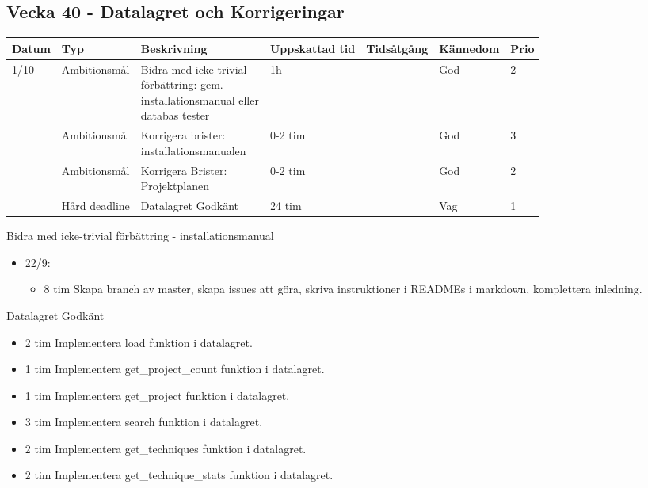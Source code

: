 \documentclass{TDP003mall}
\begin{document}
\subsection*{Vecka 40 - Datalagret och Korrigeringar}
\begin{tabularx}{\linewidth}{|l|l|X|l|l|l|l|}
	\hline
	Datum & Typ           & Beskrivning                                         & Uppskattad tid & Tidsåtgång & Kännedom    & Prio \\ [0.5ex]
	\hline                                                      
	1/10  & Ambitionsmål  & \makecell[tl]{Bidra med icke-trivial \\förbättring: gem. \\installationsmanual eller \\databas tester} & 1h             &            & God & 2    \\
	\hline                                                      
          & Ambitionsmål  & \makecell[tl]{Korrigera brister: \\installationsmanualen}  & 0-2 tim           &            & God       & 3    \\
	\hline                                                      
          & Ambitionsmål  & \makecell[tl]{Korrigera Brister: \\Projektplanen}                   & 0-2 tim           &            & God    & 2    \\
	\hline                                                      
          & Hård deadline & Datalagret Godkänt                                  & 24 tim            &            & Vag         & 1    \\
	\hline
\end{tabularx}

Bidra med icke-trivial förbättring - installationsmanual
\begin{itemize}
\item 22/9:
  \begin{itemize}
  \item 8 tim Skapa branch av master, skapa issues att göra, skriva instruktioner i READMEs i markdown, komplettera inledning.
  \end{itemize}
  \end{itemize}

Datalagret Godkänt
\begin{itemize}
\item 2 tim Implementera load funktion i datalagret.
\item 1 tim Implementera get\_project\_count funktion i datalagret.
\item 1 tim Implementera  get\_project funktion i datalagret.
\item 3 tim Implementera search funktion i datalagret.
\item 2 tim Implementera get\_techniques funktion i datalagret.
\item 2 tim Implementera get\_technique\_stats funktion i datalagret.
\end{itemize}
\end{document}
